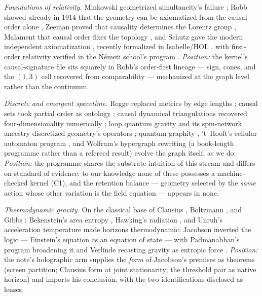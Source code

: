 \documentclass[10pt,twocolumn]{article}
\theoremstyle{definition}
\begin{document}
\emph{Foundations of relativity.} Minkowski geometrized simultaneity's failure
\cite{minkowski}; Robb showed already in 1914 that the geometry can be axiomatized
from the causal order alone \cite{robb}, Zeeman proved that causality determines
the Lorentz group \cite{zeeman}, Malament that causal order fixes the topology
\cite{malament}, and Schutz gave the modern independent
axiomatization \cite{schutz97}, recently formalized in Isabelle/HOL
\cite{schutzformal}, with first-order relativity verified in the
N\'emeti school's program \cite{stannett}. \emph{Position:} the kernel's
causal-signature file sits squarely in Robb's order-first lineage --- sign,
cones, and the $(1,3)$ cell recovered from comparability --- mechanized at the
graph level rather than the continuum.

\emph{Discrete and emergent spacetime.} Regge replaced metrics by edge lengths
\cite{regge}; causal sets took partial order as ontology \cite{bombelli}; causal
dynamical triangulations recovered four-dimensionality numerically \cite{cdt};
loop quantum gravity and its spin-network ancestry discretized geometry's operators
\cite{rovellismolin,penrose}; quantum graphity \cite{graphity}, 't~Hooft's cellular
automaton program \cite{thooftca}, and Wolfram's hypergraph rewriting \cite{wolfram} (a book-length programme
rather than a refereed result) evolve the graph itself, as we do. \emph{Position:} the programme
shares the substrate intuition of this stream and differs on standard of evidence:
to our knowledge none of these possesses a machine-checked kernel (C1), and the
retention balance --- geometry selected by the \emph{same} action whose other
variation is the field equation --- appears in none.

\emph{Thermodynamic gravity.} On the classical base of Clausius
\cite{clausius}, Boltzmann \cite{boltzmann}, and Gibbs \cite{gibbs}:
Bekenstein's area entropy \cite{bekenstein},
Hawking's radiation \cite{hawking}, and Unruh's acceleration temperature
\cite{unruh} made horizons thermodynamic; Jacobson inverted the logic ---
Einstein's equation as an equation of state \cite{jacobson} --- with
Padmanabhan's program broadening it \cite{padmanabhan} and Verlinde recasting
gravity as entropic force \cite{verlinde}. \emph{Position:} the note's
holographic arm supplies the \emph{form} of Jacobson's premises as theorems
(screen partition; Clausius form at joint stationarity; the threshold pair as
native horizon) and imports his conclusion, with the two identifications
disclosed as lenses.
\end{document}
